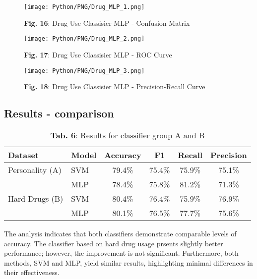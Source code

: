 \documentclass{article}
\begin{document}
\begin{figure}[!h]
    \centering
    \texttt{[image: Python/PNG/Drug\_MLP\_1.png]}
    \caption{\textbf{Fig. 16}: Drug Use Classisier MLP - Confusion Matrix}
\end{figure}
\newpage
\begin{figure}[!h]
    \centering
    \texttt{[image: Python/PNG/Drug\_MLP\_2.png]}
    \caption{\textbf{Fig. 17}: Drug Use Classisier MLP - ROC Curve}
\end{figure}

\vspace{1.5cm}

\begin{figure}[!h]
    \centering
    \texttt{[image: Python/PNG/Drug\_MLP\_3.png]}
    \caption{\textbf{Fig. 18}: Drug Use Classisier MLP - Precision-Recall Curve}
\end{figure}






\newpage

\subsection{Results - comparison}
\begin{table}[h!]
\centering
\begin{tabular}{|l|l|c|c|c|c|}
\hline
\textbf{Dataset}     & \textbf{Model} & \textbf{Accuracy} & \textbf{F1}  & \textbf{Recall} & \textbf{Precision} \\ \hline
Personality (A)         & SVM            & 79.4\%            & 75.4\%       & 75.9\%          & 75.1\%             \\ 
                     & MLP            & 78.4\%            & 75.8\%       & 81.2\%          & 71.3\%             \\ \hline
Hard Drugs (B)          & SVM            & 80.4\%            & 76.4\%       & 75.9\%          & 76.9\%             \\ 
                     & MLP            & 80.1\%            & 76.5\%       & 77.7\%          & 75.6\%             \\ \hline
\end{tabular}
\caption{\textbf{Tab. 6}: Results for classifier group A and B}

\end{table}

\vspace{1cm}

\hspace{1cm}The analysis indicates that both classifiers demonstrate comparable levels of accuracy. The classifier based on hard drug usage prsents slightly better performance; however, the improvement is not significant. Furthermore, both methods, SVM and MLP, yield similar results, highlighting minimal differences in their effectiveness.
\end{document}
